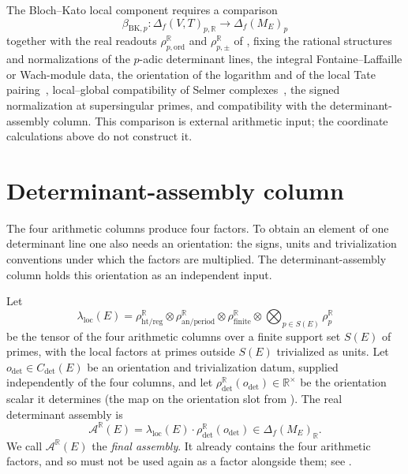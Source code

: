 \documentclass[11pt]{article}
\theoremstyle{definition}
\newcommand{\R}{\mathbb{R}}
\begin{document}
\begin{obligation}\label{obl:apparatus:rho-p-transport}
The Bloch--Kato local component requires a comparison
\[
  \beta_{\mathrm{BK},p}:
  \Delta_f(V,T)_{p,\R}
  \longrightarrow
  \Delta_f(M_E)_p
\]
together with the real readouts $\rho_{p,\mathrm{ord}}^{\R}$ and
$\rho_{p,\pm}^{\R}$ of , fixing the
rational structures and normalizations of the $p$-adic determinant lines,
the integral Fontaine--Laffaille or Wach-module data, the
orientation of the logarithm and of the local Tate pairing~\citep{Milne1986},
local--global compatibility of Selmer complexes~\citep{Nekovar2006}, the
signed normalization at supersingular primes, and compatibility with the
determinant-assembly column.  This comparison is external arithmetic
input; the coordinate calculations above do not construct it.
\end{obligation}
 \section{Determinant-assembly column}
\label{sec:det-assembly}

The four arithmetic columns produce four factors.  To obtain an element of
one determinant line one also needs an orientation: the signs, units and
trivialization conventions under which the factors are multiplied.  The
determinant-assembly column holds this orientation as an independent
input.

\begin{definition}\label{def:apparatus:det-assembly-map}
Let
\[
  \lambda_{\mathrm{loc}}(E)
  =
  \rho_{\mathrm{ht/reg}}^{\R}
  \otimes
  \rho_{\mathrm{an/period}}^{\R}
  \otimes
  \rho_{\mathrm{finite}}^{\R}
  \otimes
  \bigotimes_{p\in S(E)}\rho_p^{\R}
\]
be the tensor of the four arithmetic columns over a finite support set
$S(E)$ of primes, with the local factors at primes outside $S(E)$
trivialized as units.  Let $o_{\det}\in C_{\det}(E)$ be an orientation and
trivialization datum, supplied independently of the four columns, and let
$\rho_{\det}^{\R}(o_{\det})\in\R^\times$ be the orientation scalar it
determines (the map on the orientation slot from
).  The real determinant assembly is
\[
  \mathcal A^{\R}(E)
  =
  \lambda_{\mathrm{loc}}(E)\cdot\rho_{\det}^{\R}(o_{\det})
  \in\Delta_f(M_E)_{\R}.
\]
We call $\mathcal A^{\R}(E)$ the \emph{final assembly}.  It already
contains the four arithmetic factors, and so must not be used again as a
factor alongside them; see .
\end{definition}
\end{document}
